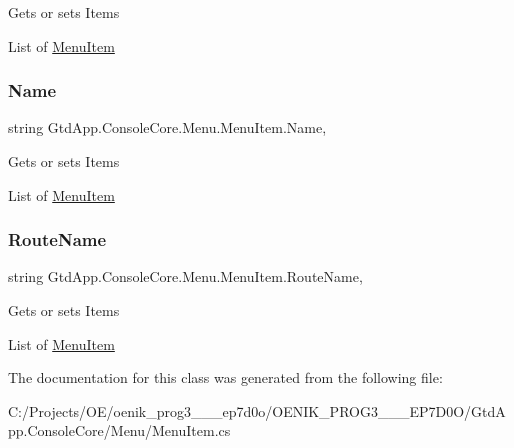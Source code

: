 Gets or sets Items 

List of \mbox{\hyperlink{class_gtd_app_1_1_console_core_1_1_menu_1_1_menu_item}{Menu\+Item}}\mbox{\label{class_gtd_app_1_1_console_core_1_1_menu_1_1_menu_item_a57deba6819044ca021f23026cff8d259}} 
\subsubsection{\texorpdfstring{Name}{Name}}
{\footnotesize\ttfamily string Gtd\+App.\+Console\+Core.\+Menu.\+Menu\+Item.\+Name\hspace{0.3cm}{\ttfamily [get]}, {\ttfamily [set]}}



Gets or sets Items 

List of \mbox{\hyperlink{class_gtd_app_1_1_console_core_1_1_menu_1_1_menu_item}{Menu\+Item}}\mbox{\label{class_gtd_app_1_1_console_core_1_1_menu_1_1_menu_item_ae681c87533e5c00712f2b7668268f32d}} 
\subsubsection{\texorpdfstring{Route\+Name}{RouteName}}
{\footnotesize\ttfamily string Gtd\+App.\+Console\+Core.\+Menu.\+Menu\+Item.\+Route\+Name\hspace{0.3cm}{\ttfamily [get]}, {\ttfamily [set]}}



Gets or sets Items 

List of \mbox{\hyperlink{class_gtd_app_1_1_console_core_1_1_menu_1_1_menu_item}{Menu\+Item}}

The documentation for this class was generated from the following file\+:\begin{DoxyCompactItemize}
\item 
C\+:/\+Projects/\+O\+E/oenik\+\_\+prog3\+\_\+\_\+\_\+ep7d0o/\+O\+E\+N\+I\+K\+\_\+\+P\+R\+O\+G3\+\_\+\_\+\_\+\+E\+P7\+D0\+O/\+Gtd\+App.\+Console\+Core/\+Menu/Menu\+Item.\+cs\end{DoxyCompactItemize}
